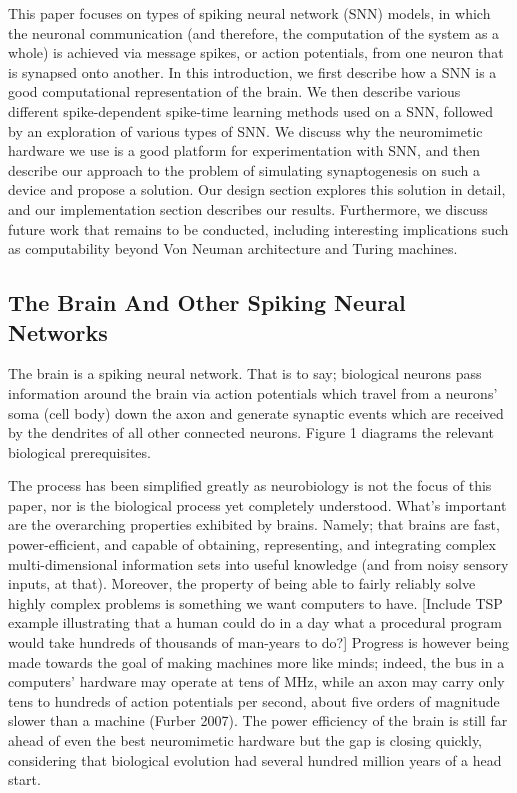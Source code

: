 \documentclass[journal]{./sty/IEEEtran}
\begin{document}
This paper focuses on types of spiking neural network (SNN) models, in which the neuronal communication (and therefore, the computation of the system as a whole) is achieved via message spikes, or action potentials, from one neuron that is synapsed onto another. 
In this introduction, we first describe how a SNN is a good computational representation of the brain. 
We then describe various different spike-dependent spike-time learning methods used on a SNN, followed by an exploration of various types of SNN. 
We discuss why the neuromimetic hardware we use is a good platform for experimentation with SNN, and then describe our approach to the problem of simulating synaptogenesis on such a device and propose a solution. 
Our design section explores this solution in detail, and our implementation section describes our results.
Furthermore, we discuss future work that remains to be conducted, including interesting implications such as computability beyond Von Neuman architecture and Turing machines.

\subsection{The Brain And Other Spiking Neural Networks}
The brain is a spiking neural network. 
That is to say; biological neurons pass information around the brain via action potentials which travel from a neurons' soma (cell body) down the axon and generate synaptic events which are received by the dendrites of all other connected neurons.
Figure 1 diagrams the relevant biological prerequisites.



The process has been simplified greatly as neurobiology is not the focus of this paper, nor is the biological process yet completely understood. 
What's important are the overarching properties exhibited by brains. 
Namely; that brains are fast, power-efficient, and capable of obtaining, representing, and integrating complex multi-dimensional information sets into useful knowledge (and from noisy sensory inputs, at that). 
Moreover, the property of being able to fairly reliably solve highly complex problems is something we want computers to have. 
[Include TSP example illustrating that a human could do in a day what a procedural program would take hundreds of thousands of man-years to do?]
Progress is however being made towards the goal of making machines more like minds; indeed, the bus in a computers' hardware may operate at tens of MHz, while an axon may carry only tens to hundreds of action potentials per second, about five orders of magnitude slower than a machine (Furber 2007). 
The power efficiency of the brain is still far ahead of even the best neuromimetic hardware but the gap is closing quickly, considering that biological evolution had several hundred million years of a head start. 
\end{document}
